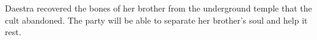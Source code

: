 Daestra recovered the bones of her brother from the underground temple that the cult abandoned.
The party will be able to separate her brother's soul and help it rest.

